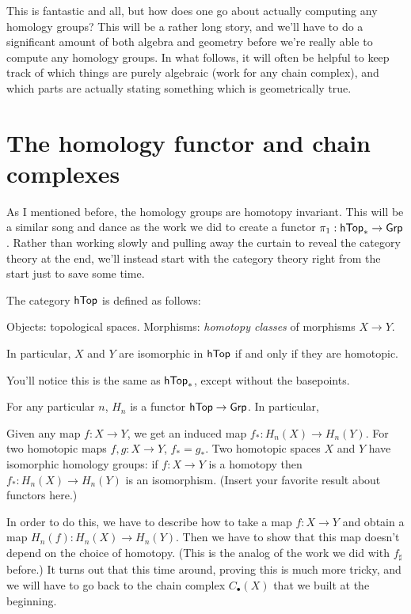 This is fantastic and all, but how does one go about actually computing any homology groups?
This will be a rather long story, and we'll have to do a significant amount of both algebra and geometry
before we're really able to compute any homology groups.
In what follows, it will often be helpful to keep track of which things are purely algebraic
(work for any chain complex), and which parts are actually stating something which is geometrically true.

\section{The homology functor and chain complexes}
As I mentioned before, the homology groups are homotopy invariant.
This will be a similar song and dance as the work we did to
create a functor $\pi_1 : \mathsf{hTop}_\ast \to \mathsf{Grp}$.
Rather than working slowly and pulling away the curtain to reveal the category theory at the end,
we'll instead start with the category theory right from the start just to save some time.

\begin{definition}
	The category $\mathsf{hTop}$ is defined as follows:
	\begin{itemize}
		\ii Objects: topological spaces.
		\ii Morphisms: \emph{homotopy classes} of morphisms $X \to Y$.
	\end{itemize}
	In particular, $X$ and $Y$ are isomorphic in $\mathsf{hTop}$
	if and only if they are homotopic.
\end{definition}
You'll notice this is the same as $\mathsf{hTop}_\ast$,
except without the basepoints.

\begin{theorem}
	\label{thm:Hn_functor}
	For any particular $n$, $H_n$ is a functor $\mathsf{hTop} \to \mathsf{Grp}$.
	In particular,
	\begin{itemize}
		\ii Given any map $f : X \to Y$, we get an induced map $f_\ast : H_n(X) \to H_n(Y)$.
		\ii For two homotopic maps $f, g : X \to Y$, $f_\ast = g_\ast$.
		\ii Two homotopic spaces $X$ and $Y$ have isomorphic homology groups:
		if $f : X \to Y$ is a homotopy then $f_\ast : H_n(X) \to H_n(Y)$ is an isomorphism.
		\ii (Insert your favorite result about functors here.)
	\end{itemize}
\end{theorem}

In order to do this, we have to describe how to take a map $f : X \to Y$
and obtain a map $H_n(f) : H_n(X) \to H_n(Y)$.
Then we have to show that this map doesn't depend on the choice of homotopy.
(This is the analog of the work we did with $f_\sharp$ before.)
It turns out that this time around, proving this is much more tricky,
and we will have to go back to the chain complex
$C_\bullet(X)$ that we built at the beginning.

